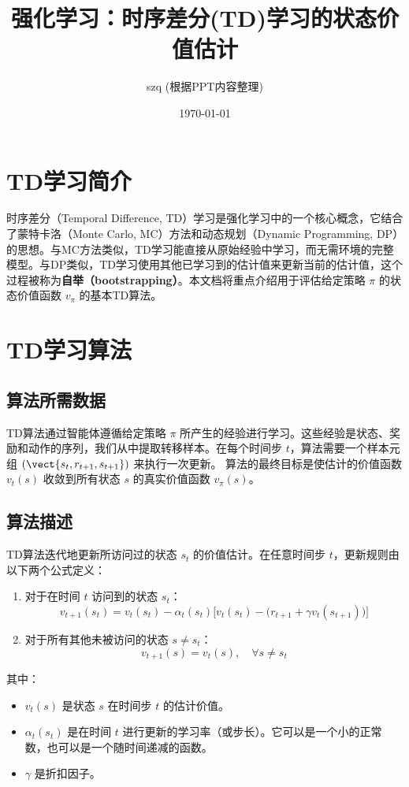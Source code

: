 \documentclass[12pt, a4paper]{article}
\title{\textbf{强化学习：时序差分(TD)学习的状态价值估计}}
\author{szq (根据PPT内容整理)}
\date{\today}
\begin{document}
\maketitle
\tableofcontents
\newpage

\section{TD学习简介}
时序差分（Temporal Difference, TD）学习是强化学习中的一个核心概念，它结合了蒙特卡洛（Monte Carlo, MC）方法和动态规划（Dynamic Programming, DP）的思想。与MC方法类似，TD学习能直接从原始经验中学习，而无需环境的完整模型。与DP类似，TD学习使用其他已学习到的估计值来更新当前的估计值，这个过程被称为\textbf{自举（bootstrapping）}。本文档将重点介绍用于评估给定策略 $\pi$ 的状态价值函数 $v_\pi$ 的基本TD算法。

\section{TD学习算法}

\subsection{算法所需数据}
TD算法通过智能体遵循给定策略 $\pi$ 所产生的经验进行学习。这些经验是状态、奖励和动作的序列，我们从中提取转移样本。在每个时间步 $t$，算法需要一个样本元组 $(\vect{s_t, r_{t+1}, s_{t+1}})$ 来执行一次更新。
算法的最终目标是使估计的价值函数 $v_t(s)$ 收敛到所有状态 $s$ 的真实价值函数 $v_\pi(s)$。

\subsection{算法描述}
TD算法迭代地更新所访问过的状态 $s_t$ 的价值估计。在任意时间步 $t$，更新规则由以下两个公式定义：

\begin{enumerate}
    \item 对于在时间 $t$ 访问到的状态 $s_t$：
    \[
    v_{t+1}(s_t) = v_t(s_t) - \alpha_t(s_t) \Big[ v_t(s_t) - \big(r_{t+1} + \gamma v_t(s_{t+1})\big) \Big] \label{eq:update}
    \]
    \item 对于所有其他未被访问的状态 $s \neq s_t$：
    \[
    v_{t+1}(s) = v_t(s), \quad \forall s \neq s_t
    \]
\end{enumerate}

其中：
\begin{itemize}[leftmargin=*]
    \item $v_t(s)$ 是状态 $s$ 在时间步 $t$ 的估计价值。
    \item $\alpha_t(s_t)$ 是在时间 $t$ 进行更新的学习率（或步长）。它可以是一个小的正常数，也可以是一个随时间递减的函数。
    \item $\gamma$ 是折扣因子。
\end{itemize}
\end{document}
